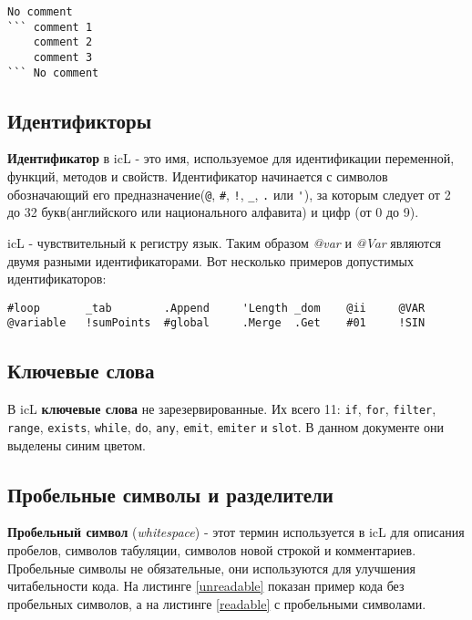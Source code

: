 \documentclass[a4paper, 14pt]{extarticle}
\begin{document}
\begin{lstlisting}[caption=Многострочный комментарий,label=multilinecomment]
No comment
``` comment 1
	comment 2
	comment 3
``` No comment
\end{lstlisting}

\subsection{Идентификторы}

\textbf{Идентификатор} в icL - это имя, используемое для идентификации переменной, функций, методов и свойств. Идентификатор начинается с символов обозначающий его предназначение(\lstinline`@`, \lstinline`#`, \lstinline`!`, \lstinline`_`, \lstinline`.` или \lstinline`'`), за которым следует от 2 до 32 букв(английского или национального алфавита) и цифр (от 0 до 9).

icL - чувствительный к регистру язык. Таким образом \textit{@var} и \textit{@Var} являются двумя разными идентификаторами. Вот несколько примеров допустимых идентификаторов:

\begin{lstlisting}[numbers=none]
#loop		_tab		.Append		'Length	_dom	@ii 	@VAR
@variable	!sumPoints	#global		.Merge	.Get	#01		!SIN
\end{lstlisting}

\subsection{Ключевые слова}

В icL \textbf{ключевые слова} не зарезервированные. Их всего 11: \lstinline`if`, \lstinline`for`, \lstinline`filter`, \lstinline`range`, \lstinline`exists`, \lstinline`while`, \lstinline`do`, \lstinline`any`, \lstinline`emit`, \lstinline`emiter` и \lstinline`slot`. В данном документе они выделены синим цветом.

\subsection{Пробельные символы и разделители}

\textbf{Пробельный символ} (\textit{whitespace}) - этот термин используется в icL для описания пробелов, символов табуляции, символов новой строкой и комментариев. Пробельные символы не обязательные, они используются для улучшения читабельности кода. На листинге \ref{unreadable} показан пример кода без пробельных символов, а на листинге \ref{readable} с пробельными символами.
\end{document}
